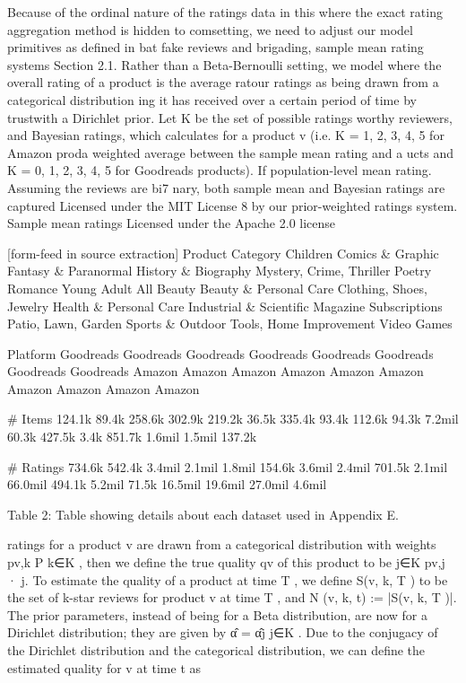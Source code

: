\documentclass[10pt]{article}
\begin{document}
\begin{ReviewVerbatim}
Because of the ordinal nature of the ratings data in this
where the exact rating aggregation method is hidden to comsetting, we need to adjust our model primitives as defined in
bat fake reviews and brigading, sample mean rating systems
Section 2.1. Rather than a Beta-Bernoulli setting, we model
where the overall rating of a product is the average ratour ratings as being drawn from a categorical distribution
ing it has received over a certain period of time by trustwith a Dirichlet prior. Let K be the set of possible ratings
worthy reviewers, and Bayesian ratings, which calculates
for a product v (i.e. K = {1, 2, 3, 4, 5} for Amazon proda weighted average between the sample mean rating and a
ucts and K = {0, 1, 2, 3, 4, 5} for Goodreads products). If
population-level mean rating. Assuming the reviews are bi7
nary, both sample mean and Bayesian ratings are captured
Licensed under the MIT License
8
by our prior-weighted ratings system. Sample mean ratings
Licensed under the Apache 2.0 license


[form-feed in source extraction]
Product Category
Children
Comics & Graphic
Fantasy & Paranormal
History & Biography
Mystery, Crime, Thriller
Poetry
Romance
Young Adult
All Beauty
Beauty & Personal Care
Clothing, Shoes, Jewelry
Health & Personal Care
Industrial & Scientific
Magazine Subscriptions
Patio, Lawn, Garden
Sports & Outdoor
Tools, Home Improvement
Video Games

Platform
Goodreads
Goodreads
Goodreads
Goodreads
Goodreads
Goodreads
Goodreads
Goodreads
Amazon
Amazon
Amazon
Amazon
Amazon
Amazon
Amazon
Amazon
Amazon
Amazon

# Items
124.1k
89.4k
258.6k
302.9k
219.2k
36.5k
335.4k
93.4k
112.6k
94.3k
7.2mil
60.3k
427.5k
3.4k
851.7k
1.6mil
1.5mil
137.2k

# Ratings
734.6k
542.4k
3.4mil
2.1mil
1.8mil
154.6k
3.6mil
2.4mil
701.5k
2.1mil
66.0mil
494.1k
5.2mil
71.5k
16.5mil
19.6mil
27.0mil
4.6mil

Table 2: Table showing details about each dataset used in
Appendix E.

ratings for a product v are drawn from a categorical distribution with weights {pv,k }P
k∈K , then we define the true quality
qv of this product to be j∈K pv,j · j.
To estimate the quality of a product at time T , we define
S(v, k, T ) to be the set of k-star reviews for product v at
time T , and N (v, k, t) := |S(v, k, T )|. The prior parameters, instead of being for a Beta distribution, are now for a
Dirichlet distribution; they are given by α̂ = {α̂j }j∈K . Due
to the conjugacy of the Dirichlet distribution and the categorical distribution, we can define the estimated quality for
v at time t as


\end{ReviewVerbatim}
\end{document}
